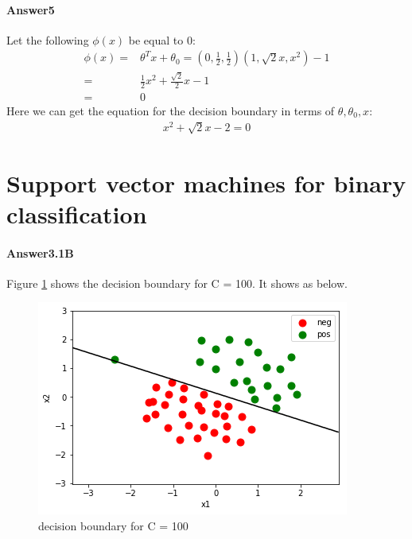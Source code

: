 \documentclass[paper=a4, fontsize=11pt]{scrartcl} %
\numberwithin{equation}{section} %
\numberwithin{figure}{section} %
\numberwithin{table}{section} %
\begin{document}
\paragraph{\textbf{Answer5}}
Let the following $\phi \left ( x \right )$ be equal to 0:
\begin{align*}
\phi \left ( x \right )=&\theta ^{T}x+\theta _{0}=\left ( 0,\frac{1}{2},\frac{1}{2} \right )\left ( 1,\sqrt{2}x,x^{2} \right )-1
\\=&\frac{1}{2}x^{2}+\frac{\sqrt{2}}{2}x-1
\\=&0
\end{align*}
Here we can get the equation for the decision boundary in terms of $\theta, \theta_{0}, x$:
\begin{align*}
x^{2}+\sqrt{2}x-2=0
\end{align*}

\section{Support vector machines for binary classification}
\paragraph{\textbf{Answer3.1B}}
Figure \ref{fig:decision_boundary} shows the decision boundary for C = 100. It shows as below.
\begin{figure}[H]
 	\centering
 	\includegraphics[scale=0.6]{./../output_7_1.png}
 	\caption{decision boundary for C = 100}
 	\label{fig:decision_boundary}
 \end{figure}
\end{document}
